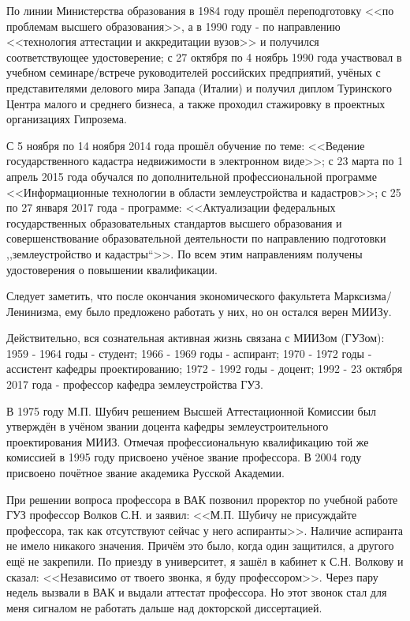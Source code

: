 По линии Министерства образования в 1984 году прошёл переподготовку <<по проблемам высшего образования>>, а в 1990 году - по направлению <<технология аттестации и аккредитации вузов>> и получился соответствующее удостоверение; с 27 октября по 4 ноябрь 1990 года участвовал в учебном семинаре\-/встрече руководителей российских предприятий, учёных с представителями делового мира Запада (Италии) и получил диплом Туринского Центра малого и среднего бизнеса, а также проходил стажировку в проектных организациях Гипрозема.

С 5 ноября по 14 ноября 2014 года прошёл обучение по теме: <<Ведение государственного кадастра недвижимости в электронном виде>>; с 23 марта по 1 апрель 2015 года обучался по дополнительной профессиональной программе <<Информационные технологии в области землеустройства и кадастров>>; с 25 по 27 января 2017 года - программе: <<Актуализации федеральных государственных образовательных стандартов высшего образования и совершенствование образовательной деятельности по направлению подготовки ,,землеустройство и кадастры``>>. По всем этим направлениям получены удостоверения о повышении квалификации. 

Следует заметить, что после окончания экономического факультета Марксизма\-/Ленинизма, ему было предложено работать у них, но он остался верен МИИЗу.

Действительно, вся сознательная активная жизнь связана с МИИЗом (ГУЗом): 1959 - 1964 годы - студент; 1966 - 1969 годы - аспирант; 1970 - 1972 годы - ассистент кафедры проектированию; 1972 - 1992 годы - доцент; 1992 - 23 октября 2017 года - профессор кафедра землеустройства ГУЗ.

В 1975 году М.П. Шубич решением Высшей Аттестационной Комиссии был утверждён в учёном звании доцента кафедры землеустроительного проектирования МИИЗ. Отмечая профессиональную квалификацию той же комиссией в 1995 году присвоено учёное звание профессора. В 2004 году присвоено почётное звание академика Русской Академии.

При решении вопроса профессора в ВАК позвонил проректор по учебной работе ГУЗ профессор Волков С.Н. и заявил: <<М.П. Шубичу не присуждайте профессора, так как отсутствуют сейчас у него аспиранты>>. Наличие аспиранта не имело никакого значения. Причём это было, когда один защитился, а другого ещё не закрепили. По приезду в университет, я зашёл в кабинет к С.Н. Волкову и сказал: <<Независимо от твоего звонка, я буду профессором>>. Через пару недель вызвали в ВАК и выдали аттестат профессора. Но этот звонок стал для меня сигналом не работать дальше над докторской диссертацией.

